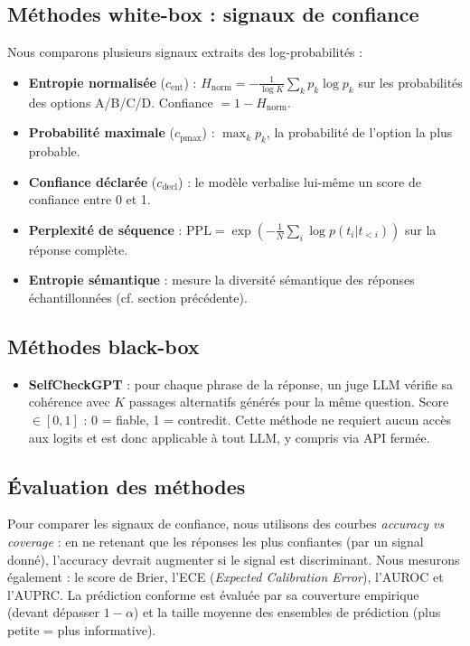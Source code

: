 \documentclass[a4paper, 11pt]{article}
\begin{document}
\subsection{Méthodes white-box : signaux de confiance}
Nous comparons plusieurs signaux extraits des log-probabilités :
\begin{itemize}[nosep]
    \item \textbf{Entropie normalisée} ($c_\text{ent}$) : $H_\text{norm} = -\frac{1}{\log K}\sum_{k} p_k \log p_k$ sur les probabilités des options A/B/C/D. Confiance $= 1 - H_\text{norm}$.
    \item \textbf{Probabilité maximale} ($c_\text{pmax}$) : $\max_k p_k$, la probabilité de l'option la plus probable.
    \item \textbf{Confiance déclarée} ($c_\text{decl}$) : le modèle verbalise lui-même un score de confiance entre 0 et 1.
    \item \textbf{Perplexité de séquence} : $\text{PPL} = \exp\left(-\frac{1}{N}\sum_i \log p(t_i | t_{<i})\right)$ sur la réponse complète.
    \item \textbf{Entropie sémantique} : mesure la diversité sémantique des réponses échantillonnées (cf. section précédente).
\end{itemize}
\subsection{Méthodes black-box}
\begin{itemize}[nosep]
    \item \textbf{SelfCheckGPT} : pour chaque phrase de la réponse, un juge LLM vérifie sa cohérence avec $K$ passages alternatifs générés pour la même question. Score $\in [0,1]$ : 0 = fiable, 1 = contredit. Cette méthode ne requiert aucun accès aux logits et est donc applicable à tout LLM, y compris via API fermée.
\end{itemize}
\subsection{Évaluation des méthodes}
Pour comparer les signaux de confiance, nous utilisons des courbes \emph{accuracy vs coverage} : en ne retenant que les réponses les plus confiantes (par un signal donné), l'accuracy devrait augmenter si le signal est discriminant. Nous mesurons également : le score de Brier, l'ECE (\emph{Expected Calibration Error}), l'AUROC et l'AUPRC. La prédiction conforme est évaluée par sa couverture empirique (devant dépasser $1-\alpha$) et la taille moyenne des ensembles de prédiction (plus petite = plus informative).
\end{document}
